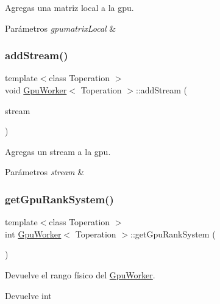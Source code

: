 Agregas una matriz local a la gpu. 


\begin{DoxyParams}{Parámetros}
{\em gpumatrix\+Local} & \\
\hline
\end{DoxyParams}
\mbox{\label{classGpuWorker_a872fa500edc16caf33a73cca29c34526}} 
\subsubsection{\texorpdfstring{add\+Stream()}{addStream()}}
{\footnotesize\ttfamily template$<$class Toperation $>$ \\
void \hyperlink{classGpuWorker}{Gpu\+Worker}$<$ Toperation $>$\+::add\+Stream (\begin{DoxyParamCaption}\item[{cuda\+Stream\+\_\+t $\ast$}]{stream }\end{DoxyParamCaption})}



Agregas un stream a la gpu. 


\begin{DoxyParams}{Parámetros}
{\em stream} & \\
\hline
\end{DoxyParams}
\mbox{\label{classGpuWorker_a2c6a4c743d19b27fe79d63b595f8a491}} 
\subsubsection{\texorpdfstring{get\+Gpu\+Rank\+System()}{getGpuRankSystem()}}
{\footnotesize\ttfamily template$<$class Toperation $>$ \\
int \hyperlink{classGpuWorker}{Gpu\+Worker}$<$ Toperation $>$\+::get\+Gpu\+Rank\+System (\begin{DoxyParamCaption}{ }\end{DoxyParamCaption})}



Devuelve el rango físico del \hyperlink{classGpuWorker}{Gpu\+Worker}. 

\begin{DoxyReturn}{Devuelve}
int 
\end{DoxyReturn}
\mbox{\label{classGpuWorker_a383304583c095b121117d65084fbce9f}} 
